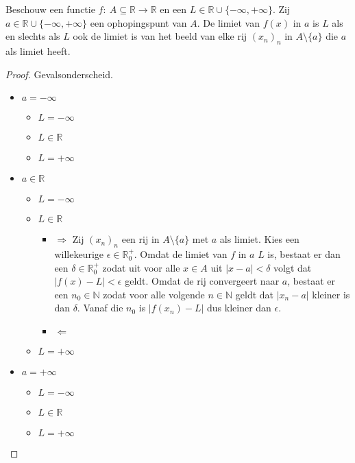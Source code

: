 \documentclass[main.tex]{subfiles}
\begin{document}
\begin{bpr}
  \label{pr:limiet-van-functie-asa-limiet-van-beeld-van-rij}
  Beschouw een functie $f:\ A \subseteq \mathbb{R} \rightarrow \mathbb{R}$ en een $L \in \mathbb{R} \cup \{-\infty,+\infty\}$.
  Zij $a \in \mathbb{R} \cup \{-\infty,+\infty\}$ een ophopingspunt van $A$.
  De limiet van $f(x)$ in $a$ is $L$ als en slechts als $L$ ook de limiet is van het beeld van elke rij $(x_{n})_{n}$ in $A\setminus\{a\}$ die $a$ als limiet heeft.

  \begin{proof}
    Gevalsonderscheid.
    \begin{itemize}
    \item $a = -\infty$
      \begin{itemize}
      \item $L = -\infty$
      \item $L \in \mathbb{R}$
      \item $L = +\infty$
      \end{itemize}
    \item $a\in\mathbb{R}$
      \begin{itemize}
      \item $L = -\infty$
      \item $L \in \mathbb{R}$
        \begin{itemize}
        \item $\Rightarrow$
          Zij $(x_{n})_{n}$ een rij in $A\setminus \{a\}$ met $a$ als limiet.
          Kies een willekeurige $\epsilon \in \mathbb{R}_{0}^{+}$.
          Omdat de limiet van $f$ in $a$ $L$ is, bestaat er dan een $\delta \in \mathbb{R}_{0}^{+}$ zodat uit voor alle $x\in A$ uit $|x-a|<\delta$ volgt dat $|f(x)-L|<\epsilon$ geldt.
          Omdat de rij convergeert naar $a$, bestaat er een $n_{0}\in \mathbb{N}$ zodat voor alle volgende $n\in\mathbb{N}$ geldt dat $|x_{n}-a|$ kleiner is dan $\delta$.
          Vanaf die $n_{0}$ is $|f(x_{n})-L|$ dus kleiner dan $\epsilon$.
        \item $\Leftarrow$
        \end{itemize}
      \item $L = +\infty$
      \end{itemize}
    \item $a = +\infty$
      \begin{itemize}
      \item $L = -\infty$
      \item $L \in \mathbb{R}$
      \item $L = +\infty$
      \end{itemize}
    \end{itemize}
  \end{proof}
\end{bpr}
\end{document}
